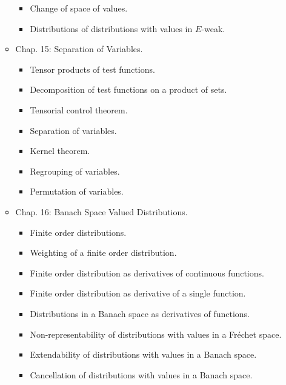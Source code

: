 \documentclass{article}
\begin{document}
\begin{enumerate}
\begin{itemize}
\begin{itemize}
			\item {\sf Change of space of values.}
			\item {\sf Distributions of distributions with values in $E$-weak.}
		\end{itemize}
		\item {\sf Chap. 15: Separation of Variables.}
		\begin{itemize}
			\item {\sf Tensor products of test functions.}
			\item {\sf Decomposition of test functions on a product of sets.}
			\item {\sf Tensorial control theorem.}
			\item {\sf Separation of variables.}
			\item {\sf Kernel theorem.}
			\item {\sf Regrouping of variables.}
			\item {\sf Permutation of variables.}
		\end{itemize}
		\item {\sf Chap. 16: Banach Space Valued Distributions.}
		\begin{itemize}
			\item {\sf Finite order distributions.}
			\item {\sf Weighting of a finite order distribution.}
			\item {\sf Finite order distribution as derivatives of continuous functions.}
			\item {\sf Finite order distribution as derivative of a single function.}
			\item {\sf Distributions in a Banach space as derivatives of functions.}
			\item {\sf Non-representability of distributions with values in a Fr\'echet space.}
			\item {\sf Extendability of distributions with values in a Banach space.}
			\item {\sf Cancellation of distributions with values in a Banach space.}
		\end{itemize}
	\end{itemize}
\end{enumerate}

\end{document}
